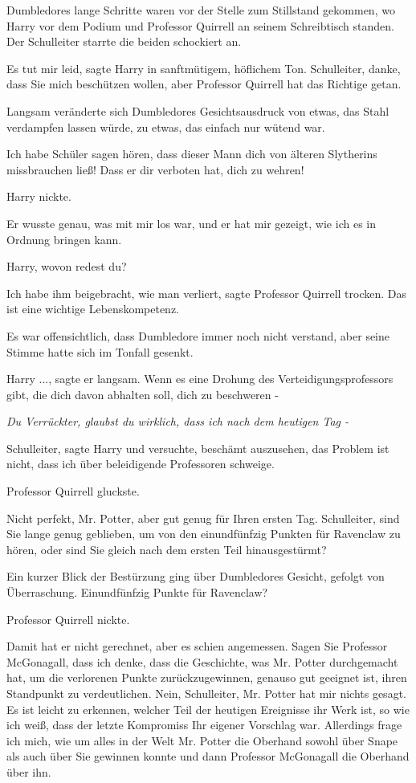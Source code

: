 Dumbledores lange Schritte waren vor der Stelle zum Stillstand gekommen, wo
Harry vor dem Podium und Professor Quirrell an seinem Schreibtisch standen. Der
Schulleiter starrte die beiden schockiert an.

\glqq{}Es tut mir leid\grqq{}, sagte Harry in sanftmütigem, höflichem Ton. \glqq
Schulleiter, danke, dass Sie mich beschützen wollen, aber Professor Quirrell hat
das Richtige getan.\grqq{}

Langsam veränderte sich Dumbledores Gesichtsausdruck von etwas, das Stahl
verdampfen lassen würde, zu etwas, das einfach nur wütend war.

\glqq{}Ich habe Schüler sagen hören, dass dieser Mann dich von älteren Slytherins
missbrauchen ließ! Dass er dir verboten hat, dich zu wehren!\grqq{}

Harry nickte.

\glqq{}Er wusste genau, was mit mir los war, und er hat mir gezeigt, wie ich es
in Ordnung bringen kann.\grqq{}

\glqq{}Harry, wovon redest du?\grqq{}

\glqq{}Ich habe ihm beigebracht, wie man verliert\grqq{}, sagte Professor
Quirrell trocken. \glqq{}Das ist eine wichtige Lebenskompetenz.\grqq{}

Es war offensichtlich, dass Dumbledore immer noch nicht verstand, aber seine
Stimme hatte sich im Tonfall gesenkt.

\glqq{}Harry ...\grqq{}, sagte er langsam. \glqq{}Wenn es eine Drohung des
Verteidigungsprofessors gibt, die dich davon abhalten soll, dich zu beschweren
-\grqq{}

\emph{Du Verrückter, glaubst du wirklich, dass ich nach dem heutigen Tag -}

\glqq{}Schulleiter\grqq{}, sagte Harry und versuchte, beschämt auszusehen, \glqq
das Problem ist nicht, dass ich über beleidigende Professoren schweige.\grqq{}

Professor Quirrell gluckste.

\glqq{}Nicht perfekt, Mr. Potter, aber gut genug für Ihren ersten Tag.
Schulleiter, sind Sie lange genug geblieben, um von den einundfünfzig Punkten
für Ravenclaw zu hören, oder sind Sie gleich nach dem ersten Teil
hinausgestürmt?\grqq{}

Ein kurzer Blick der Bestürzung ging über Dumbledores Gesicht, gefolgt von
Überraschung. \glqq{}Einundfünfzig Punkte für Ravenclaw?\grqq{}

Professor Quirrell nickte.

\glqq{}Damit hat er nicht gerechnet, aber es schien angemessen. Sagen Sie
Professor McGonagall, dass ich denke, dass die Geschichte, was Mr. Potter
durchgemacht hat, um die verlorenen Punkte zurückzugewinnen, genauso gut
geeignet ist, ihren Standpunkt zu verdeutlichen. Nein, Schulleiter, Mr. Potter
hat mir nichts gesagt. Es ist leicht zu erkennen, welcher Teil der heutigen
Ereignisse ihr Werk ist, so wie ich weiß, dass der letzte Kompromiss Ihr eigener
Vorschlag war. Allerdings frage ich mich, wie um alles in der Welt Mr. Potter
die Oberhand sowohl über Snape als auch über Sie gewinnen konnte und dann
Professor McGonagall die Oberhand über ihn.\grqq{}

